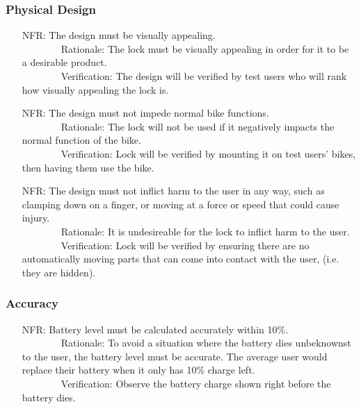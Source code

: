 \documentclass[12pt]{article}
\newcounter{nfrnum} %
\begin{document}
\subsubsection{Physical Design}
\begin{itemize}
\setlength{\itemindent}{.5in}
\item[NFR\refstepcounter{nfrnum}\thenfrnum\label{NFRVisual}:] The design must be visually appealing.
\\ \-\ \-\ \-\ \-\ \-\ \-\ \-\ \-\ Rationale: The lock must be visually appealing in order for it to be a desirable product.
\\ \-\ \-\ \-\ \-\ \-\ \-\ \-\ \-\ Verification: The design will be verified by test users who will rank how visually  appealing the lock is.
\item[NFR\refstepcounter{nfrnum}\thenfrnum\label{NFRFunc}:] The design must not impede normal bike functions.
\\ \-\ \-\ \-\ \-\ \-\ \-\ \-\ \-\ Rationale: The lock will not be used if it negatively impacts the normal function of the bike.
\\ \-\ \-\ \-\ \-\ \-\ \-\ \-\ \-\ Verification: Lock will be verified by mounting it on test users' bikes, then having them use the bike.
\item[NFR\refstepcounter{nfrnum}\thenfrnum\label{NFRHarm}:] The design must not inflict harm to the user in any way, such as clamping down on a finger, or moving at a force or speed that could cause injury. 
\\ \-\ \-\ \-\ \-\ \-\ \-\ \-\ \-\ Rationale: It is undesireable for the lock to inflict harm to the user.
\\ \-\ \-\ \-\ \-\ \-\ \-\ \-\ \-\ Verification: Lock will be verified by ensuring there are no automatically moving parts that can come into contact with the user, (i.e. they are hidden). 

\end{itemize}

\subsubsection{Accuracy}
\begin{itemize}
\setlength{\itemindent}{.5in}
 \item[NFR\refstepcounter{nfrnum}\thenfrnum\label{NFRBatteryLevel}:] Battery level must be calculated accurately within 10\%.
\\ \-\ \-\ \-\ \-\ \-\ \-\ \-\ \-\ Rationale: To avoid a situation where the battery dies unbeknownst to the user, the battery level must be accurate. The average user would replace their battery when it only has 10\% charge left.
\\ \-\ \-\ \-\ \-\ \-\ \-\ \-\ \-\ Verification: Observe the battery charge shown right before the battery dies. 
\end{itemize}
\end{document}
